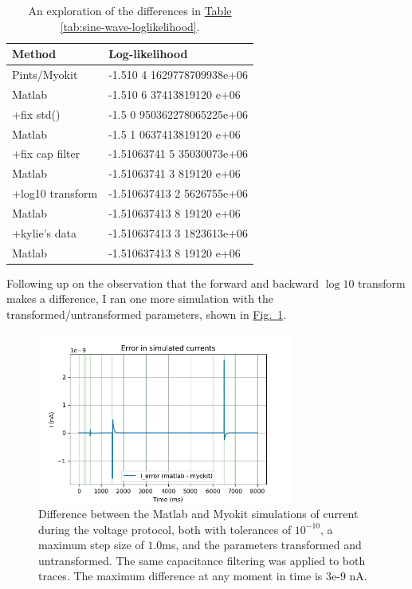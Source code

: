 \documentclass[preprint,authoryear,10pt]{elsarticle}
\newcommand{\startrowcolors}{\rowcolors{2}{gray!15}{white}}
\newcommand*{\thead}[1]{\bfseries #1}
\newcommand\fig[2][]{\hyperref[fig:#2]{Fig.~\ref*{fig:#2}\ifstrempty{#1}{}{.#1}}}
\newcommand{\tab}[1]{\hyperref[tab:#1]{Table \ref*{tab:#1}}}
\begin{document}
\begin{table}[H]
\centering
\caption{%
An exploration of the differences in \tab{sine-wave-loglikelihood}.
}
\label{tab:sine-wave-loglikelihood2}
\startrowcolors
\footnotesize
\begin{tabular}{ll}
\hline
\thead{Method} & \thead{Log-likelihood} \\
\hline
Pints/Myokit        & -1.510 4 1629778709938e+06 \\
Matlab              & -1.510 6 37413819120  e+06 \\
\hline
+fix std()          & -1.5 0 950362278065225e+06 \\
Matlab              & -1.5 1 0637413819120  e+06 \\
\hline
+fix cap filter     & -1.51063741 5 35030073e+06 \\
Matlab              & -1.51063741 3 819120  e+06 \\
\hline
+log10 transform    & -1.510637413 2 5626755e+06 \\
Matlab              & -1.510637413 8 19120  e+06 \\
\hline
+kylie's data      & -1.510637413 3 1823613e+06 \\
Matlab              & -1.510637413 8 19120  e+06 \\
\hline
\end{tabular}
\end{table}

Following up on the observation that the forward and backward $\log10$
 transform makes a difference, I ran one more simulation with the
 transformed/untransformed parameters, shown in
 \fig{sine-wave-current-error-tol10-max-step-transform}.

\begin{figure}[H]
\centerline{
\includegraphics[width=0.75\textwidth]{fig/sine-wave-current-error-tol10-max-step-transform}
}
\caption{%
Difference between the Matlab and Myokit simulations of current during the
 voltage protocol, both with tolerances of $10^{-10}$, a maximum step size of
 $1.0$ms, and the parameters transformed and untransformed.
The same capacitance filtering was applied to both traces.
The maximum difference at any moment in time is 3e-9 nA.
}
\label{fig:sine-wave-current-error-tol10-max-step-transform}
\end{figure}
\end{document}
